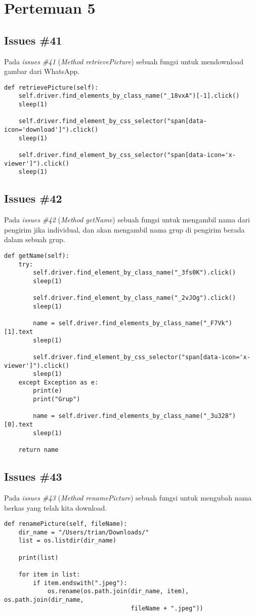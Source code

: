 \chapter{Pertemuan 5}

\section{Issues \#41}
Pada \textit{issues \#41} (\textit{Method retrievePicture}) sebuah fungsi untuk mendownload gambar dari WhatsApp.
\begin{verbatim}
def retrievePicture(self):
    self.driver.find_elements_by_class_name("_18vxA")[-1].click()
    sleep(1)

    self.driver.find_element_by_css_selector("span[data-icon='download']").click()
    sleep(1)

    self.driver.find_element_by_css_selector("span[data-icon='x-viewer']").click()
    sleep(1)
\end{verbatim}

\section{Issues \#42}
Pada \textit{issues \#42} (\textit{Method getName}) sebuah fungsi untuk mengambil nama dari pengirim jika individual, dan akan mengambil nama grup di pengirim berada dalam sebuah grup.
\begin{verbatim}
def getName(self):
    try:
        self.driver.find_element_by_class_name("_3fs0K").click()
        sleep(1)

        self.driver.find_element_by_class_name("_2vJOg").click()
        sleep(1)

        name = self.driver.find_elements_by_class_name("_F7Vk")[1].text
        sleep(1)

        self.driver.find_element_by_css_selector("span[data-icon='x-viewer']").click()
        sleep(1)
    except Exception as e:
        print(e)
        print("Grup")

        name = self.driver.find_elements_by_class_name("_3u328")[0].text
        sleep(1)

    return name
\end{verbatim}

\section{Issues \#43}
Pada \textit{issues \#43} (\textit{Method renamePicture}) sebuah fungsi untuk mengubah nama berkas yang telah kita download.
\begin{verbatim}
def renamePicture(self, fileName):
    dir_name = "/Users/trian/Downloads/"
    list = os.listdir(dir_name)

    print(list)

    for item in list:
        if item.endswith(".jpeg"):
            os.rename(os.path.join(dir_name, item), os.path.join(dir_name, 
                                   fileName + ".jpeg"))
\end{verbatim}

